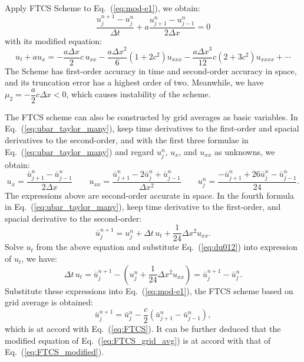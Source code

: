 \documentclass[]{article}
\newcommand{\me}{\mathrm{e}}
\newcommand{\mi}{\mathrm{i}}
\begin{document}
Apply FTCS Scheme to Eq.~(\ref{eq:mod-e1}), we obtain:
\begin{equation}
    \dfrac{u_j^{n+1}-u_j^n}{\Delta t}+a\dfrac{u_{j+1}^n-u_{j-1}^n}{2\Delta x}=0
    \label{eq:FTCS}
\end{equation}
with its modified equation:
\begin{equation}
    u_t+au_x=-\dfrac{a\Delta x}{2}c\, u_{xx}-\dfrac{a\Delta x^2}{6}(1+2c^2)u_{xxx} -\dfrac{a\Delta x^3}{12}c(2+3c^2)u_{xxxx}+\cdots
    \label{eq:FTCS_modified}
\end{equation}
The Scheme has first-order accuracy in time and second-order accuracy
in space, and its truncation error has a highest order of
two. Meanwhile, we have $\mu_2 = -\dfrac{a}{2}c\Delta x<0$, which
causes instability of the scheme.

The FTCS scheme can also be constructed by grid averages as basic
variables. In Eq.~(\ref{eq:ubar_taylor_many}), keep time derivatives
to the first-order and spacial derivatives to the second-order, and
with the first three formulae in Eq.~(\ref{eq:ubar_taylor_many}) and
regard $u_j^n$, $u_x$, and $u_{xx}$ as unknowns, we obtain:
\begin{equation}
  u_x = \frac{\bar u_{j+1}^n-\bar u_{j-1}^n}{2\Delta x} \qquad
  u_{xx} = \frac{\bar u_{j+1}^n-2\bar u_j^n+\bar u_{j-1}^n}{\Delta x^2} \qquad
  u_j^n = \frac{-\bar u_{j+1}^n + 26\bar u_j^n - \bar u_{j-1}^n}{24}.
  \label{eq:du012}
\end{equation}
The expressions above are second-order accurate in space. In the
fourth formula in Eq.~(\ref{eq:ubar_taylor_many}), keep time
derivative to the first-order, and spacial derivative to the 
second-order:
\[
\bar u_{j}^{n+1} = u_j^n+\Delta t\, u_t + \frac{1}{24} \Delta x^2 u_{xx}.
\]
Solve $u_t$ from the above equation and substitute
Eq.~(\ref{eq:du012}) into expression of $u_t$, we have:
\[
\Delta t\, u_t =  \bar u_j^{n+1}-\left(u_j^n +\frac{1}{24} \Delta x^2
u_{xx}\right) = \bar u_j^{n+1}- \bar u_{j}^n.
\]
Substitute these expressions into Eq.~(\ref{eq:mod-e1}), the FTCS
scheme based on grid average is obtained:
\begin{equation}
  \bar u_j^{n+1} = \bar u_j^n - \frac{c}{2} \left(\bar u_{j+1}^n-\bar u_{j-1}^n\right),
  \label{eq:FTCS_grid_avg}
\end{equation}
which is at accord with Eq.~(\ref{eq:FTCS}). It can be further deduced
that the modified equation of Eq.~(\ref{eq:FTCS_grid_avg}) is at
accord with that of Eq.~(\ref{eq:FTCS_modified}).
\end{document}
